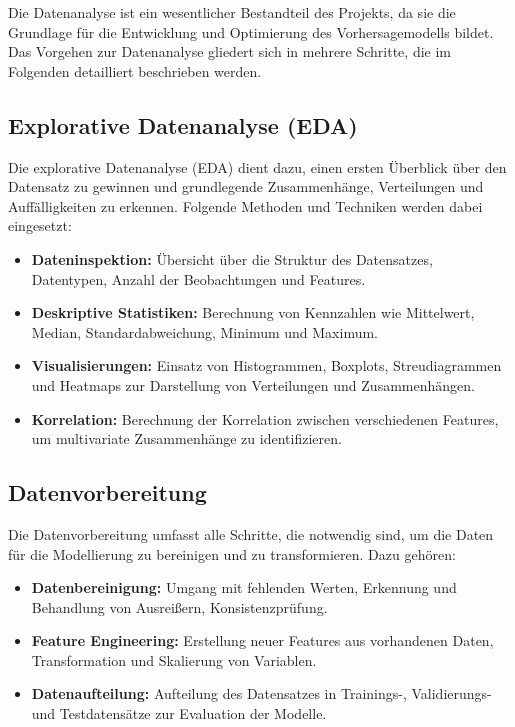 \documentclass[%
pdftex,
oneside,			%
11pt,				%
parskip=half,		%
headheight = 12pt,	%
headsepline,		%
footsepline,		%
footheight = 16pt,	%
abstracton,		%
DIV=calc,		%
BCOR=8mm,		%
headinclude=false,	%
footinclude=false,	%
listof=totoc,		%
toc=bibliography,	%
]{scrreprt}	%
\begin{document}
        Die Datenanalyse ist ein wesentlicher Bestandteil des Projekts, da sie die Grundlage für die Entwicklung und Optimierung des Vorhersagemodells bildet. 
        Das Vorgehen zur Datenanalyse gliedert sich in mehrere Schritte, die im Folgenden detailliert beschrieben werden.
        
        \subsection{Explorative Datenanalyse (EDA)}
            
            Die explorative Datenanalyse (EDA) dient dazu, einen ersten Überblick über den Datensatz zu gewinnen und grundlegende Zusammenhänge, Verteilungen und Auffälligkeiten zu erkennen. 
            Folgende Methoden und Techniken werden dabei eingesetzt:
            
            \begin{itemize}
                \item \textbf{Dateninspektion:} Übersicht über die Struktur des Datensatzes, Datentypen, Anzahl der Beobachtungen und Features.
                \item \textbf{Deskriptive Statistiken:} Berechnung von Kennzahlen wie Mittelwert, Median, Standardabweichung, Minimum und Maximum.
                \item \textbf{Visualisierungen:} Einsatz von Histogrammen, Boxplots, Streudiagrammen und Heatmaps zur Darstellung von Verteilungen und Zusammenhängen.
                \item \textbf{Korrelation:} Berechnung der Korrelation zwischen verschiedenen Features, um multivariate Zusammenhänge zu identifizieren.
            \end{itemize}
            
            \subsection{Datenvorbereitung}
            
            Die Datenvorbereitung umfasst alle Schritte, die notwendig sind, um die Daten für die Modellierung zu bereinigen und zu transformieren. 
            Dazu gehören:
            
            \begin{itemize}
                \item \textbf{Datenbereinigung:} Umgang mit fehlenden Werten, Erkennung und Behandlung von Ausreißern, Konsistenzprüfung.
                \item \textbf{Feature Engineering:} Erstellung neuer Features aus vorhandenen Daten, Transformation und Skalierung von Variablen.
                \item \textbf{Datenaufteilung:} Aufteilung des Datensatzes in Trainings-, Validierungs- und Testdatensätze zur Evaluation der Modelle.
            \end{itemize}
            
\end{document}
